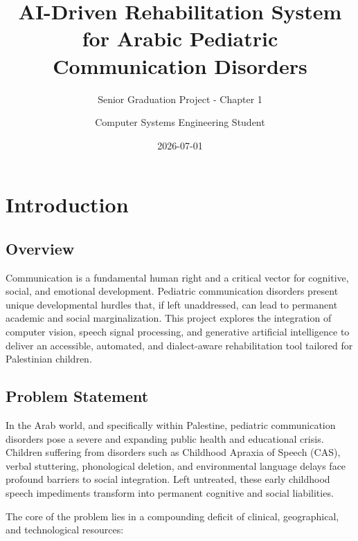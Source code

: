 \documentclass[
  letterpaper,
  DIV=11,
  numbers=noendperiod]{scrartcl}
\title{AI-Driven Rehabilitation System for Arabic Pediatric
Communication Disorders}
\subtitle{Senior Graduation Project - Chapter 1}
\author{Computer Systems Engineering Student}
\date{2026-07-01}
\renewcommand*\contentsname{Table of contents}
\newcommand\contentsname{Table of contents}
\begin{document}
\maketitle

\renewcommand*\contentsname{Table of contents}
{
\setcounter{tocdepth}{3}
\tableofcontents
}

\section{Introduction}\label{introduction}

\subsection{Overview}\label{overview}

Communication is a fundamental human right and a critical vector for
cognitive, social, and emotional development. Pediatric communication
disorders present unique developmental hurdles that, if left
unaddressed, can lead to permanent academic and social marginalization.
This project explores the integration of computer vision, speech signal
processing, and generative artificial intelligence to deliver an
accessible, automated, and dialect-aware rehabilitation tool tailored
for Palestinian children.

\subsection{Problem Statement}\label{problem-statement}

In the Arab world, and specifically within Palestine, pediatric
communication disorders pose a severe and expanding public health and
educational crisis. Children suffering from disorders such as Childhood
Apraxia of Speech (CAS), verbal stuttering, phonological deletion, and
environmental language delays face profound barriers to social
integration. Left untreated, these early childhood speech impediments
transform into permanent cognitive and social liabilities.

The core of the problem lies in a compounding deficit of clinical,
geographical, and technological resources:
\end{document}
